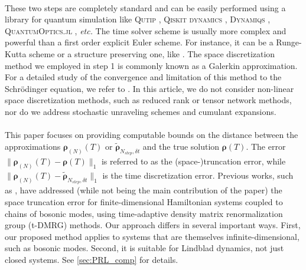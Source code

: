 \documentclass[a4paper,onecolumn,amsmath,amssymb,amsfonts,accepted=2026-03-06]{quantumarticle}
\newcommand{\rN}{{\boldsymbol{\rho}_{(N)}}}
\begin{document}
\paragraph{}

These two steps are completely standard and can be easily performed using a library for quantum simulation like \textsc{Qutip} \cite{JOHANSSON20131234}, \textsc{Qiskit dynamics} \cite{qiskit_dynamics_2023}, \textsc{Dynamiqs} \cite{guilmin2024dynamiqs}, \textsc{QuantumOptics.jl} \cite{kramer2018quantumoptics}, \textit{etc.} The time solver scheme is usually more complex and powerful than a first order explicit Euler scheme. For instance, it can be a Runge-Kutta scheme or a structure preserving one, like \cite{cao2024structurepreservingnumericalschemeslindblad,appelo2024krauskinghighordercompletely,robin2025unconditionallystabletimediscretization}. The space discretization method we employed in step 1 is commonly known as a Galerkin approximation. For a detailed study of the convergence and limitation of this method to the Schrödinger equation, we refer to \cite{fischer2025quantumparticlewrongbox}. In this article, we do not consider non-linear space discretization methods, such as reduced rank or tensor network methods, nor do we address stochastic unraveling schemes and cumulant expansions.

\paragraph{}

This paper focuses on providing computable bounds on the distance between the approximations $\rN(T)$ or $\tilde{ \boldsymbol{\rho}}_{N_{step},\delta t}$ and the true solution $\boldsymbol{\rho}(T)$. The error $\|\rN(T)-\boldsymbol{\rho}(T)\|_1$ is referred to as the (space-)truncation error, while $\|\rN(T)-\tilde{ \boldsymbol{\rho}}_{N_{step},\delta t}\|_1$ is the time discretization error. Previous works, such as \cite{PRL_estimator}, have addressed (while not being the main contribution of the paper) the space truncation error for finite-dimensional Hamiltonian systems coupled to chains of bosonic modes, using time-adaptive density matrix renormalization group (t-DMRG) methods. Our approach differs in several important ways. First, our proposed method applies to systems that are themselves infinite-dimensional, such as bosonic modes. Second, it is suitable for Lindblad dynamics, not just closed systems. See \cref{sec:PRL_comp} for details.
\end{document}
